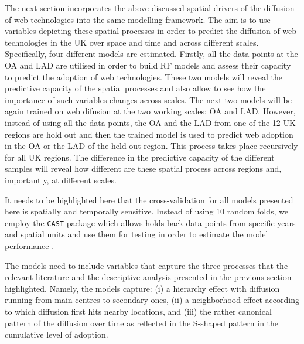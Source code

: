 \documentclass[
  authoryear,
  preprint,
  3p]{elsarticle}
\begin{document}
The next section incorporates the above discussed spatial drivers of the
diffusion of web technologies into the same modelling framework. The aim
is to use variables depicting these spatial processes in order to
predict the diffusion of web technologies in the UK over space and time
and across different scales. Specifically, four different models are
estimated. Firstly, all the data points at the OA and LAD are utilised
in order to build RF models and assess their capacity to predict the
adoption of web technologies. These two models will reveal the
predictive capacity of the spatial processes and also allow to see how
the importance of such variables changes across scales. The next two
models will be again trained on web difusion at the two working scales:
OA and LAD. However, instead of using all the data points, the OA and
the LAD from one of the 12 UK regions are hold out and then the trained
model is used to predict web adoption in the OA or the LAD of the
held-out region. This process takes place recursively for all UK
regions. The difference in the predictive capacity of the different
samples will reveal how different are these spatial process across
regions and, importantly, at different scales.

It needs to be highlighted here that the cross-validation for all models
presented here is spatially and temporally sensitive. Instead of using
10 random folds, we employ the \texttt{CAST} package which allows holds
back data points from specific years and spatial units and use them for
testing in order to estimate the model performance
\citep{meyer2018improving}.

The models need to include variables that capture the three processes
that the relevant literature and the descriptive analysis presented in
the previous section highlighted. Namely, the models capture: (i) a
hierarchy effect with diffusion running from main centres to secondary
ones, (ii) a neighborhood effect according to which diffusion first hits
nearby locations, and (iii) the rather canonical pattern of the
diffusion over time as reflected in the S-shaped pattern in the
cumulative level of adoption.
\end{document}
